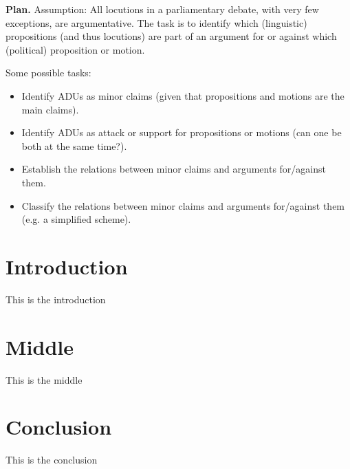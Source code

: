 \UseRawInputEncoding

\textbf{Plan.} Assumption: All locutions in a parliamentary debate, with very few exceptions, are argumentative.   The task is to identify which (linguistic) propositions (and thus locutions) are part of an argument for or against which (political) proposition or motion.

Some possible tasks:

\begin{itemize}
    \item Identify ADUs as minor claims (given that propositions and motions are the main claims).
    \item Identify ADUs as attack or support for propositions or motions (can one be both at the same time?).
    \item Establish the relations between minor claims and arguments for/against them.
    \item Classify the relations between minor claims and arguments for/against them (e.g. a simplified scheme).
\end{itemize}

\section{Introduction}

This is the introduction

\section{Middle}

This is the middle

\section{Conclusion}

This is the conclusion